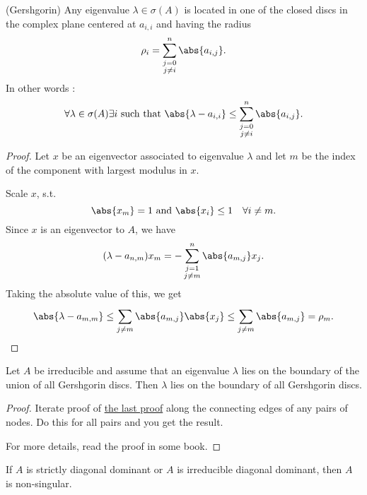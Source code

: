 \begin{theorem}(Gershgorin)
\label{thm:gershgorin}
Any eigenvalue $\lambda \in \sigma (A)$ is located in one of the closed discs in the complex plane centered at $a_{i,i}$ and having the radius
\[
	\rho_{i} = \sum_{\substack{j=0 \\ j \neq i}}^{n}{\abs{a_{i,j}} }
.\] 
In other words : 
\[
	\forall \lambda \in \sigma (A) \exists i \text{ such that } \abs{\lambda - a_{i,i}}  \leq \sum_{\substack{j=0 \\ j \neq i}}^{n}{\abs{a_{i,j}} }
.\] 
\end{theorem}

\begin{proof}
\label{thm:gershgorinproof}
	Let $x$ be an eigenvector associated to eigenvalue $\lambda$ and let $m$ be the index of the component with largest modulus in $x$.

	Scale $x$, s.t.
	\[
	\abs{x_{m}}  = 1 \text{ and } \abs{x_{i}} \leq 1 \quad \forall i \neq m
	.\] 
	Since $x$ is an eigenvector to $A$, we have
	\[
		(\lambda - a_{n,m}) x_{m} = - \sum_{\substack{j=1 \\ j \neq m}}^{n}{\abs{a_{m,j}} x_{j}}
	.\] 
	Taking the absolute value of this, we get
	\[
		\abs{\lambda - a_{m,m}}  \leq \sum_{j\neq m}^{}{\abs{a_{m,j}} \abs{x_{j}} } \leq \sum_{j\neq m}^{}{\abs{a_{m,j}} } = \rho_{m}
	.\] 
\end{proof}

\begin{theorem}
\label{thm:gershgorinboundary}
	Let $A$ be irreducible and assume that an eigenvalue $\lambda$ lies on the boundary of the union of all Gershgorin discs. Then $\lambda$ lies on the boundary of all Gershgorin discs.
\end{theorem}

\begin{proof}
\label{thm:gershgorinboundaryproof}
	Iterate proof of \href{thm:gershgorinproof}{the last proof} along the connecting edges of any pairs of nodes. Do this for all pairs and you get the result.

	For more details, read the proof in some book.
\end{proof}

\begin{korollar}
\label{thm:gershgorinboundarycorollary1}
	If $A$ is strictly diagonal dominant or $A$ is irreducible diagonal dominant, then $A$ is non-singular.
\end{korollar}

